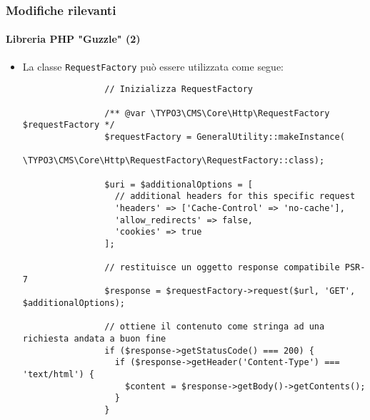\begin{frame}[fragile]
	\frametitle{Modifiche rilevanti}
	\framesubtitle{Libreria PHP "Guzzle" (2)}

	\lstset{basicstyle=\tiny\ttfamily}

	\begin{itemize}

		\item La classe \texttt{RequestFactory} può essere utilizzata come segue:

			\begin{lstlisting}
				// Inizializza RequestFactory

				/** @var \TYPO3\CMS\Core\Http\RequestFactory $requestFactory */
				$requestFactory = GeneralUtility::makeInstance(
				  \TYPO3\CMS\Core\Http\RequestFactory\RequestFactory::class);

				$uri = $additionalOptions = [
				  // additional headers for this specific request
				  'headers' => ['Cache-Control' => 'no-cache'],
				  'allow_redirects' => false,
				  'cookies' => true
				];

				// restituisce un oggetto response compatibile PSR-7
				$response = $requestFactory->request($url, 'GET', $additionalOptions);

				// ottiene il contenuto come stringa ad una richiesta andata a buon fine
				if ($response->getStatusCode() === 200) {
				  if ($response->getHeader('Content-Type') === 'text/html') {
				    $content = $response->getBody()->getContents();
				  }
				}
			\end{lstlisting}

	\end{itemize}

\end{frame}

